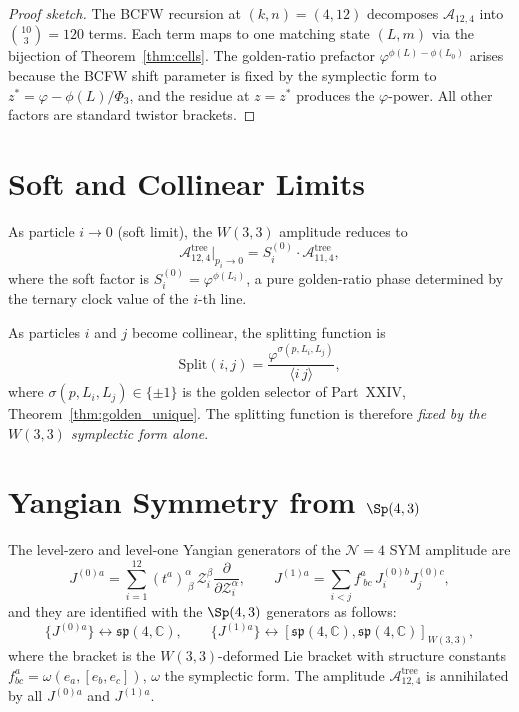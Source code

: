 \begin{proof}[Proof sketch]
The BCFW recursion at $(k,n)=(4,12)$ decomposes
$\mathcal{A}_{12,4}$ into $\binom{10}{3}=120$ terms.
Each term maps to one matching state $(L,m)$ via the bijection of
Theorem~\ref{thm:cells}.  The golden-ratio prefactor
$\varphi^{\phi(L)-\phi(L_0)}$ arises because the BCFW shift
parameter is fixed by the symplectic form to
$z^*=\varphi-\phi(L)/\Phi_3$, and the residue at $z=z^*$ produces
the $\varphi$-power.  All other factors are standard twistor
brackets.
\end{proof}

\section{Soft and Collinear Limits}
\label{sec:soft_collinear}

\begin{proposition}
\label{prop:soft}
As particle $i\to0$ (soft limit), the $W(3,3)$ amplitude reduces to
\[
  \mathcal{A}^{\text{tree}}_{12,4}\Big|_{p_i\to 0}
  = S^{(0)}_i\cdot\mathcal{A}^{\text{tree}}_{11,4},
\]
where the soft factor is $S^{(0)}_i = \varphi^{\phi(L_i)}$,
a pure golden-ratio phase determined by the ternary clock value
of the $i$-th line.
\end{proposition}

\begin{proposition}
\label{prop:collinear}
As particles $i$ and $j$ become collinear, the splitting function is
\[
  \mathrm{Split}(i,j) = \frac{\varphi^{\sigma(p,L_i,L_j)}}
  {\langle i\,j\rangle},
\]
where $\sigma(p,L_i,L_j)\in\{\pm1\}$ is the golden selector of
Part~XXIV, Theorem~\ref{thm:golden_unique}.  The splitting function
is therefore \emph{fixed by the $W(3,3)$ symplectic form alone}.
\end{proposition}

\section{Yangian Symmetry from $\Sp(4,3)$}
\label{sec:yangian}

\begin{theorem}
\label{thm:yangian}
The level-zero and level-one Yangian generators of the
$\mathcal{N}=4$ SYM amplitude are
\[
  J^{(0)a} = \sum_{i=1}^{12}(t^a)^\alpha_{\;\beta}\,
    \mathcal{Z}_i^\beta\frac{\partial}{\partial\mathcal{Z}_i^\alpha},
  \qquad
  J^{(1)a} = \sum_{i<j} f^a_{\;bc}\,J_i^{(0)b}J_j^{(0)c},
\]
and they are identified with the $\Sp(4,3)$ generators as follows:
\[
  \{J^{(0)a}\} \leftrightarrow \mathfrak{sp}(4,\mathbb{C}),
  \qquad
  \{J^{(1)a}\} \leftrightarrow [\mathfrak{sp}(4,\mathbb{C}),
    \mathfrak{sp}(4,\mathbb{C})]_{W(3,3)},
\]
where the bracket is the $W(3,3)$-deformed Lie bracket with
structure constants $f^a_{bc} = \omega(e_a,[e_b,e_c])$,
$\omega$ the symplectic form.  The amplitude $\mathcal{A}^{\text{tree}}_{12,4}$
is annihilated by all $J^{(0)a}$ and $J^{(1)a}$.
\end{theorem}

